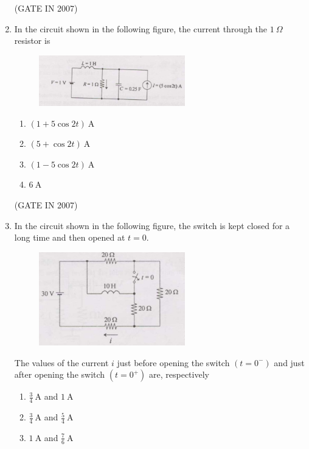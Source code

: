 \documentclass[journal]{IEEEtran}
\begin{document}
\begin{enumerate}
\hfill(GATE IN 2007)
\item In the circuit shown in the following figure, the current through the $1\ \Omega$ resistor is
\begin{figure}[H]
    \centering
      \includegraphics[width=0.6\textwidth]{20.jpg} 
      \caption{}
    \label{fig:fig20} 
\end{figure}
\begin{multicols}{2}
\begin{enumerate}
\item $(1+5\cos 2t)\ \mathrm{A}$  
\item $(5+\cos 2t)\ \mathrm{A}$  
\item $(1-5\cos 2t)\ \mathrm{A}$  
\item $6\ \mathrm{A}$  
\end{enumerate}
\end{multicols}
\hfill(GATE IN 2007)
\item In the circuit shown in the following figure, the switch is kept closed for a long time and then opened at $t=0$.  
\begin{figure}[H]
    \centering
      \includegraphics[width=0.6\textwidth]{21.jpg} 
      \caption{}
    \label{fig:fig21} 
\end{figure}
The values of the current $i$ just before opening the switch $(t=0^-)$ and just after opening the switch $(t=0^+)$ are, respectively
\begin{multicols}{4}
\begin{enumerate}
\item $\tfrac{3}{4}\ \mathrm{A}$ and $1\ \mathrm{A}$  
\item $\tfrac{3}{4}\ \mathrm{A}$ and $\tfrac{5}{4}\ \mathrm{A}$  
\item $1\ \mathrm{A}$ and $\tfrac{7}{6}\ \mathrm{A}$  

\end{enumerate}
\end{multicols}
\end{enumerate}
\end{document}
